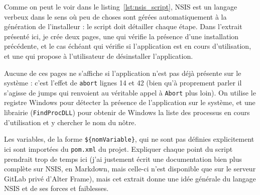 Comme on peut le voir dans le listing~\ref{lst:nsis_script}, NSIS est un langage verbeux dans le sens où peu de choses sont gérées automatiquement à la génération de l'installeur : le script doit détailler chaque étape. Dans l'extrait présenté ici, je crée deux pages, une qui vérifie la présence d'une installation précédente, et le cas échéant qui vérifie si l'application est en cours d'utilisation, et une qui propose à l'utilisateur de désinstaller l'application. 

Aucune de ces pages ne s'affiche si l'application n'est pas déjà présente sur le système : c'est l'effet de \verb|abort| lignes 14 et 42 (bien qu'à proprement parler il s'agisse de jumps qui renvoient au véritable appel à \verb|Abort| plus loin). On utilise le registre Windows pour détecter la présence de l'application sur le système, et une librairie (\verb|FindProcDLL|) pour obtenir de Windows la liste des processus en cours d'utilisation et y chercher le nom du nôtre. 

Les variables, de la forme \verb|${nomVariable}|, qui ne sont pas définies explicitement ici sont importées du \verb|pom.xml| du projet. Expliquer chaque point du script prendrait trop de temps ici (j'ai justement écrit une documentation bien plus complète sur NSIS, en Markdown, mais celle-ci n'est disponible que sur le serveur GitLab privé d'Alter Frame), mais cet extrait donne une idée générale du langage NSIS et de ses forces et faiblesses.